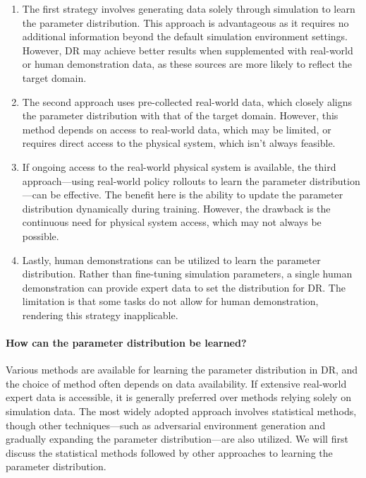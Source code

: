\begin{enumerate}
    \item The first strategy involves generating data solely through simulation to learn the parameter distribution. This approach is advantageous as it requires no additional information beyond the default simulation environment settings. However, DR may achieve better results when supplemented with real-world or human demonstration data, as these sources are more likely to reflect the target domain.
    \item The second approach uses pre-collected real-world data, which closely aligns the parameter distribution with that of the target domain. However, this method depends on access to real-world data, which may be limited, or requires direct access to the physical system, which isn’t always feasible.
    \item If ongoing access to the real-world physical system is available, the third approach—using real-world policy rollouts to learn the parameter distribution—can be effective. The benefit here is the ability to update the parameter distribution dynamically during training. However, the drawback is the continuous need for physical system access, which may not always be possible.
    \item Lastly, human demonstrations can be utilized to learn the parameter distribution. Rather than fine-tuning simulation parameters, a single human demonstration can provide expert data to set the distribution for DR. The limitation is that some tasks do not allow for human demonstration, rendering this strategy inapplicable.
\end{enumerate}


\paragraph{How can the parameter distribution be learned?}
Various methods are available for learning the parameter distribution in DR, and the choice of method often depends on data availability. If extensive real-world expert data is accessible, it is generally preferred over methods relying solely on simulation data. The most widely adopted approach involves statistical methods, though other techniques—such as adversarial environment generation and gradually expanding the parameter distribution—are also utilized. We will first discuss the statistical methods followed by other approaches to learning the parameter distribution.

